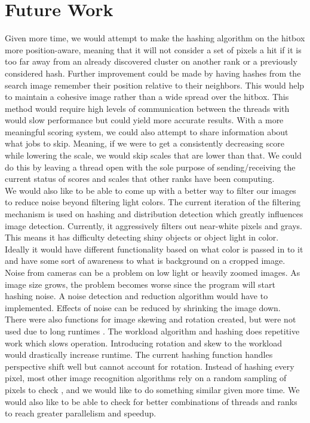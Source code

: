 \documentclass[10pt, journal]{vgtc}                %
\newcommand\tab[1][1cm]{\hspace*{#1}}
\begin{document}
\section{Future Work}
\begin{flushleft}
\tab Given more time, we would attempt to make the hashing algorithm on the hitbox more position-aware, meaning that it will not consider a set of pixels a hit if it is too far away from an already discovered cluster on another rank or a previously considered hash. Further improvement could be made by having hashes from the search image remember their position relative to their neighbors. This would help to maintain a cohesive image rather than a wide spread over the hitbox. This method would require high levels of communication between the threads with would slow performance but could yield more accurate results. With a more meaningful scoring system, we could also attempt to share information about what jobs to skip. Meaning, if we were to get a consistently decreasing score while lowering the scale, we would skip scales that are lower than that. We could do this by leaving a thread open with the sole purpose of sending/receiving the current status of scores and scales that other ranks have been computing. \\\smallskip
	\tab We would also like to be able to come up with a better way to filter our images to reduce noise beyond filtering light colors. The current iteration of the filtering mechanism is used on hashing and distribution detection which greatly influences image detection. Currently, it aggressively filters out near-white pixels and grays. This means it has difficulty detecting shiny objects or object light in color. Ideally it would have different functionality based on what color is passed in to it and have some sort of awareness to what is background on a cropped image.  \\\smallskip
	\tab Noise from cameras can be a problem on low light or heavily zoomed images. As image size grows, the problem becomes worse since the program will start hashing noise. A noise detection and reduction algorithm would have to implemented. Effects of noise can be reduced by shrinking the image down. \\\smallskip
	\tab There were also functions for image skewing and rotation created, but were not used due to long runtimes \cite{Paeth:1990:FAG:90767.90811}. The workload algorithm and hashing does repetitive work which slows operation. Introducing rotation and skew to the workload would drastically increase runtime. The current hashing function handles perspective shift well but cannot account for rotation.
	Instead of hashing every pixel, most other image recognition algorithms rely on a random sampling of pixels to check \cite{7838673,1634363}, and we would like to do something similar given more time. We would also like to be able to check for better combinations of threads and ranks to reach greater parallelism and speedup. 
	
\end{flushleft}
\end{document}
